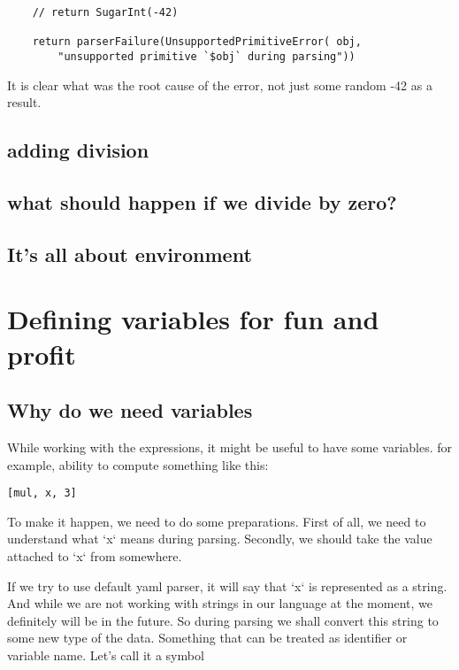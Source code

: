 \documentclass[11pt]{article}
\begin{document}
\begin{verbatim}
    // return SugarInt(-42)

    return parserFailure(UnsupportedPrimitiveError( obj,
        "unsupported primitive `$obj` during parsing"))
\end{verbatim}

It is clear what was the root cause of the error, not just some random -42 as a result.


\subsection{adding division}
\label{sec:org694c632}
\subsection{what should happen if we divide by zero?}
\label{sec:org8a58892}
\subsection{It's all about environment}
\label{sec:org8042bab}
\section{Defining variables for fun and profit}
\label{sec:orgbc381c6}
\subsection{Why do we need variables}
\label{sec:org42f9468}
While working with the expressions, it might be useful to have some variables.
for example, ability to compute something like this:
\begin{verbatim}
[mul, x, 3]
\end{verbatim}
To make it happen, we need to do some preparations.
First of all, we need to understand what `x` means during parsing.
Secondly, we should take the value attached to `x` from somewhere.

If we try to use default yaml parser, it will say that `x` is represented as a string.
And while we are not working with strings in our language at the moment, we definitely will be in the future.
So during parsing we shall convert this string to some new type of the data.
Something that can be treated as identifier or variable name. Let's call it a symbol
\end{document}

